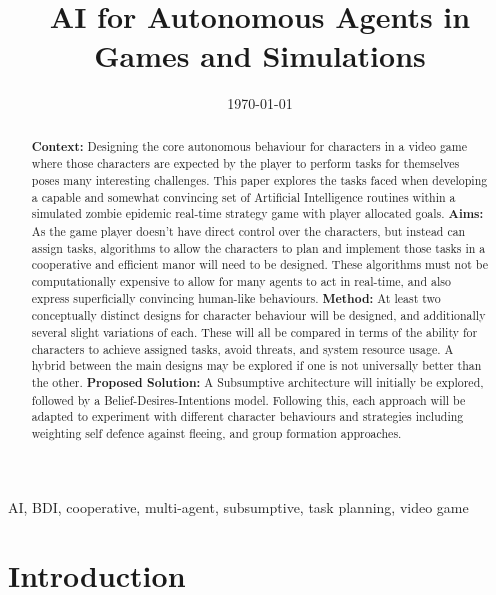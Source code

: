 \documentclass[12pt,a4paper]{article}
\title{AI for Autonomous Agents in Games and Simulations}
\date{\today}
\begin{document}
\maketitle

\begin{abstract} {\bf Context:} Designing the core autonomous behaviour for characters in a video game where those characters are expected by the player to perform tasks for themselves poses many interesting challenges. This paper explores the tasks faced when developing a capable and somewhat convincing set of Artificial Intelligence routines within a simulated zombie epidemic real-time strategy game with player allocated goals.
{\bf Aims:} As the game player doesn't have direct control over the characters, but instead can assign tasks, algorithms to allow the characters to plan and implement those tasks in a cooperative and efficient manor will need to be designed. These algorithms must not be computationally expensive to allow for many agents to act in real-time, and also express superficially convincing human-like behaviours.
{\bf Method:} At least two conceptually distinct designs for character behaviour will be designed, and additionally several slight variations of each. These will all be compared in terms of the ability for characters to achieve assigned tasks, avoid threats, and system resource usage. A hybrid between the main designs may be explored if one is not universally better than the other.
{\bf Proposed Solution:} A Subsumptive architecture will initially be explored, followed by a Belief-Desires-Intentions model. Following this, each approach will be adapted to experiment with different character behaviours and strategies including weighting self defence against fleeing, and group formation approaches.
\end{abstract}

\begin{keywords}
AI, BDI, cooperative, multi-agent, subsumptive, task planning, video game
\end{keywords}

\section{Introduction}
\end{document}
